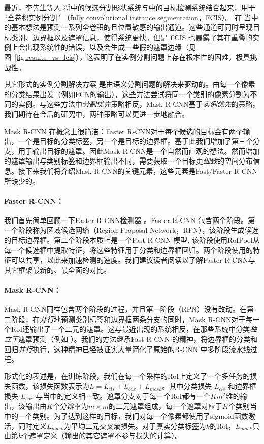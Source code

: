 最近，李先生等人  将中的候选分割形状系统与中的目标检测系统结合起来，用于 ``全卷积实例分割'' （fully convolutional instance segmentation，FCIS）。 在  当中的基本想法是预测一系列全卷积的且位置敏感的输出通道。这些通道可同时呈现目标类别、边界框以及遮罩信息，使得系统更快。但是 FCIS 也暴露了其在重叠的实例上会出现系统性的错误，以及会生成一些假的遮罩边缘（见图~\ref{fig:results_vs_fcis}），这表明了在实例分割问题上存在根本性的困难，极具挑战性。

其它形式的实例分割解决方案  是由语义分割问题的解决来驱动的。由每一个像素的分类结果出发（例如FCN的输出），这些方法尝试将同一个类别的像素分割为不同的实例。与这些方法中\emph{分割优先}策略相反，Mask R-CNN基于\emph{实例优先}的策略。我们期待在今后的研究中，两种策略可以更进一步地融合。

\label{sec:maskR-CNN}

Mask R-CNN 在概念上很简洁：Faster R-CNN对于每个候选的目标会有两个输出，一个是目标的分类标签，另一个是目标的边界框。基于此我们增加了第三个分支，用于输出目标的遮罩。因此Mask R-CNN是一个自然而直观的想法。然而增加的遮罩输出与类别标签和边界框输出不同，需要获取一个目标更\emph{细致}的空间分布信息。接下来我们将介绍Mask R-CNN的关键元素，这些元素是Fast/Faster R-CNN所缺少的。

\paragraph{Faster R-CNN：} 我们首先简单回顾一下Faster R-CNN检测器 。Faster R-CNN 包含两个阶段。第一个阶段称为区域候选网络（Region Proposal Network，RPN），该阶段生成候选的目标边界框。第二个阶段本质上是一个Fast R-CNN 模型, 该阶段使用RoIPool从每一个候选框中提取特征，将这些特征用于分类和边界框回归。两个阶段使用的特征可以共享，以此来加速检测的速度。我们建议读者阅读以了解Faster R-CNN与其它框架最新的、最全面的对比。

\paragraph{Mask R-CNN：} Mask R-CNN同样包含两个阶段的过程，并且第一阶段（RPN）没有改动。在第二阶段，在\emph{并行}地预测类别标签和边界框两条分支的同时，Mask R-CNN对于每一个RoI还输出了一个二元的遮罩。这与最近出现的系统相反，在那些系统中分类\emph{独立于}遮罩预测（例如 ）。我们的方法继承Fast R-CNN 的精神，将边界框的分类和回归\emph{并行}执行，这种精神已经被证实大量简化了原始的R-CNN 中多阶段流水线过程。

形式化的表述是，在训练阶段，我们在每一个采样的RoI上定义了一个多任务的损失函数，该损失函数表示为$L = L_{cls} + L_{box} + L_{mask}$。其中分类损失 $L_{cls}$ 和边界框损失 $L_{box}$ 与当中的定义相一致。遮罩分支对于每一个RoI都有一个$Km^2$维的输出，该输出由$K$个分辨率为$m \times m$的二元遮罩组成，每一个遮罩对应于$K$个类别当中的一个类别。为了达到这样的目标，我们对每一个像素都使用了sigmoid函数激活，同时定义$L_{mask}$为平均二元交叉熵损失。对于真实分类标签为$k$的RoI，$L_{mask}$只由第$k$个遮罩定义（输出的其它遮罩不参与损失的计算）。

